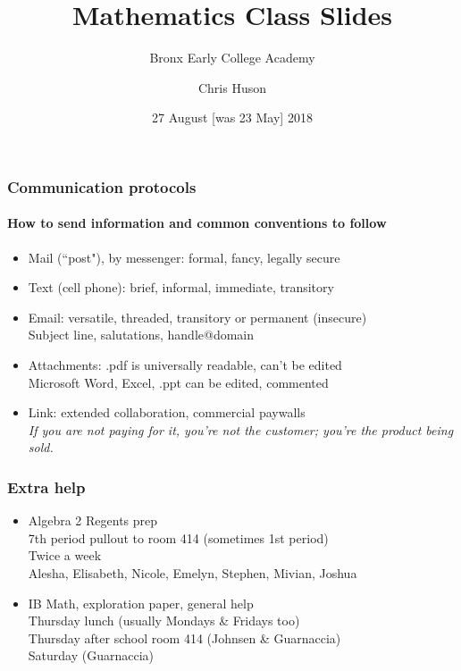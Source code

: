 \documentclass{beamer}
\title{Mathematics Class Slides}
\subtitle{Bronx Early College Academy}
\author{Chris Huson}
\date{27 August [was 23 May] 2018}
\begin{document}
\frame{\titlepage}

\frame
{
  \frametitle{Communication protocols}
  \framesubtitle{How to send information and common conventions to follow}
\begin{itemize}
      \item Mail (``post"), by messenger: formal, fancy, legally secure
      \item Text (cell phone): brief, informal, immediate, transitory
      \item Email: versatile, threaded, transitory or permanent (insecure)\\
      Subject line, salutations, handle@domain
      \item Attachments: .pdf is universally readable, can't be edited\\
      Microsoft Word, Excel, .ppt can be edited, commented
      \item Link: extended collaboration, commercial paywalls\\
      \emph{If you are not paying for it, you're not the customer; you're the product being sold.}
\end{itemize}
 }


\frame
{
  \frametitle{Extra help}
\begin{itemize}
      \item Algebra 2 Regents prep\\
      7th period pullout to room 414 (sometimes 1st period)\\
      Twice a week\\
      Alesha, Elisabeth, Nicole, Emelyn, Stephen, Mivian, Joshua\\[20pt]
      \item IB Math, exploration paper, general help\\
      Thursday lunch (usually Mondays \& Fridays too)\\
      Thursday after school room 414 (Johnsen \& Guarnaccia)\\
      Saturday (Guarnaccia)
\end{itemize}
 }
\end{document}

